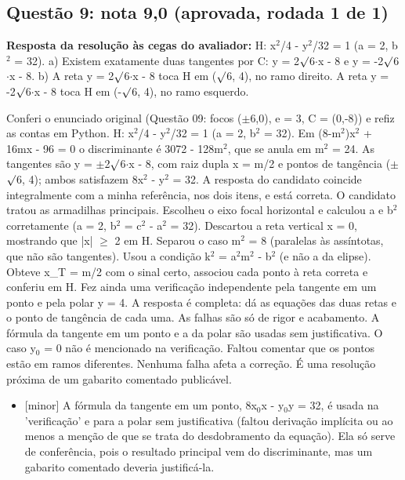\documentclass{article}%
\begin{document}
\subsection*{Questão 9: nota 9,0 (aprovada, rodada 1 de 1)}%
\textbf{Resposta da resolução às cegas do avaliador:} H: x$^2$/4 - y$^2$/32 = 1 (a = 2, b$^2$ = 32).\newline%
a) Existem exatamente duas tangentes por C: y = 2$\surd$6$\cdot$x - 8 e y = -2$\surd$6$\cdot$x - 8.\newline%
b) A reta y = 2$\surd$6$\cdot$x - 8 toca H em ($\surd$6, 4), no ramo direito. A reta y = -2$\surd$6$\cdot$x - 8 toca H em (-$\surd$6, 4), no ramo esquerdo.\par %
Conferi o enunciado original (Questão 09: focos ($\pm$6,0), e = 3, C = (0,-8)) e refiz as contas em Python. H: x$^2$/4 - y$^2$/32 = 1 (a = 2, b$^2$ = 32). Em (8-m$^2$)x$^2$ + 16mx - 96 = 0 o discriminante é 3072 - 128m$^2$, que se anula em m$^2$ = 24. As tangentes são y = $\pm$2$\surd$6$\cdot$x - 8, com raiz dupla x = m/2 e pontos de tangência ($\pm$$\surd$6, 4); ambos satisfazem 8x$^2$ - y$^2$ = 32. A resposta do candidato coincide integralmente com a minha referência, nos dois itens, e está correta. O candidato tratou as armadilhas principais. Escolheu o eixo focal horizontal e calculou a e b$^2$ corretamente (a = 2, b$^2$ = c$^2$ - a$^2$ = 32). Descartou a reta vertical x = 0, mostrando que |x| $\geq$ 2 em H. Separou o caso m$^2$ = 8 (paralelas às assíntotas, que não são tangentes). Usou a condição k$^2$ = a$^2$m$^2$ - b$^2$ (e não a da elipse). Obteve x\_T = m/2 com o sinal certo, associou cada ponto à reta correta e conferiu em H. Fez ainda uma verificação independente pela tangente em um ponto e pela polar y = 4. A resposta é completa: dá as equações das duas retas e o ponto de tangência de cada uma. As falhas são só de rigor e acabamento. A fórmula da tangente em um ponto e a da polar são usadas sem justificativa. O caso y$_{0}$ = 0 não é mencionado na verificação. Faltou comentar que os pontos estão em ramos diferentes. Nenhuma falha afeta a correção. É uma resolução próxima de um gabarito comentado publicável.%
\begin{itemize}%
\item%
{[}minor{]} A fórmula da tangente em um ponto, 8x$_{0}$x - y$_{0}$y = 32, é usada na 'verificação' e para a polar sem justificativa (faltou derivação implícita ou ao menos a menção de que se trata do desdobramento da equação). Ela só serve de conferência, pois o resultado principal vem do discriminante, mas um gabarito comentado deveria justificá{-}la.%

\end{itemize}$$
\end{document}
